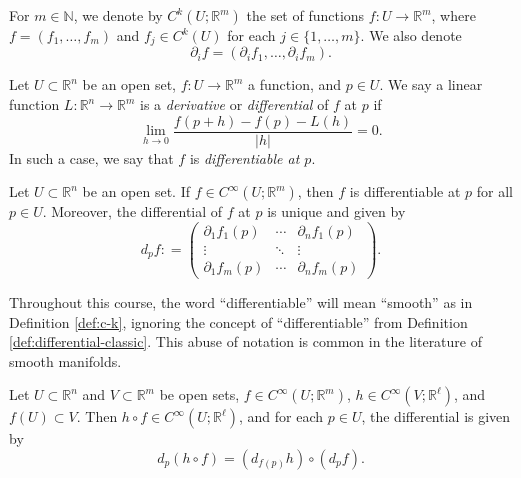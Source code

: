 \documentclass{ximera}
\begin{document}
\begin{notation}
    For $m \in \mathbb{N}$, we denote by $C ^{k} (U ; \mathbb{R}^m)$ the set of functions $f : U \to \mathbb{R}^m$, where $f = (f_1, \ldots, f_m ) $ and $f _j \in C^k (U)$ for each $j \in \{ 1, \ldots , m \}$.  We also denote
    \[      \partial _i f = (\partial _i f_1, \ldots , \partial_i f_m).                        \]
\end{notation}






\begin{definition}\label{def:differential-classic}
    Let $U \subset \mathbb{R}^n$ be an open set, $f : U \to \mathbb{R}^m $ a function, and $p \in U$. We say a linear function $L : \mathbb{R}^n \to \mathbb{R} ^m  $ is a \emph{derivative} or \emph{differential} of $f$ at $p$ if 
    \[     \lim_{h \to 0} \frac{f(p + h)  - f(p) - L (h)}{\vert h \vert }  = 0    .        \]
    In such a case, we say that $f$ is \emph{differentiable at $p$}. 
\end{definition}




\begin{theorem}\label{thm:c1-implies-diff}
    Let $U \subset \mathbb{R}^n$ be an open set. If  $f \in C^{\infty}( U ; \mathbb{R}^m ) $, then $f$ is differentiable at $p$ for all $p \in U$. Moreover, the differential of $f$ at $p$ is unique and given by
    \[     d_p f  : = \begin{pmatrix}
        \partial_1 f_1 (p) & \cdots & \partial _n f_1(p) \\
        \vdots & \ddots & \vdots \\
        \partial_1 f_m(p) & \cdots & \partial_n f_m(p)
    \end{pmatrix}   .     \]
\end{theorem}




\begin{notation}
    Throughout this course, the word ``differentiable'' will mean ``smooth'' as in Definition \ref{def:c-k}, ignoring the concept of ``differentiable'' from Definition \ref{def:differential-classic}.  This abuse of notation is common in the literature of smooth manifolds.
\end{notation}





\begin{theorem}\label{thm:chain rule}
    Let $U \subset \mathbb{R}^n$ and $V \subset \mathbb{R}^m$ be open sets, $f \in C^{\infty}(U;\mathbb{R}^m)$, $h \in C^{\infty}(V; \mathbb{R}^{\ell})$, and $f(U) \subset V$. Then $h \circ f \in C^{\infty} (U; \mathbb{R}^{\ell})$, and for each $p \in U$, the differential is given by
    \[    d_p (h \circ f) = ( d_{f(p)} h ) \circ (d_p f ) .   \]
\end{theorem}
\end{document}
